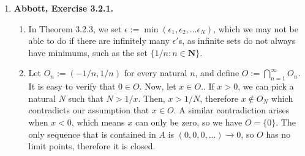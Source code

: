 \documentclass{article}
\makeatletter
\DeclarePairedDelimiter\abs{\lvert}{\rvert}
\let\oldabs\abs
\def\abs{\@ifstar{\oldabs}{\oldabs*}}
\newcommand{\N}{\mathbf{N}}
\newcommand{\R}{\mathbf{R}}
\newcommand{\set}[1]{\{#1\}}
\newcommand{\exc}[2][Abbott]{\item \textbf{#1, Exercise #2.}}
\newcommand{\lep}[1][L]{#1et $\epsilon > 0$ be arbitrary}
\let\oldmin\min
\renewcommand{\min}[1]{\oldmin \left( #1 \right)}
\makeatother
\begin{document}
\begin{enumerate}
\begin{enumerate}
        While in the previous proof we used the fact that $(s_n)$ converges to prove that
        \begin{equation*}
            \sum_{k=1}^\infty s_k(y_k-y_{k+1})
        \end{equation*} converges, we really only needed $(s_n)$ to be bounded, so the same proof applies. The other slight difference is when we applied the Algebraic Limit Theorem to show that $s_n y_{n+1}$ converges. This does not work here, since $(s_n)$ does not necessarily converge. To see that this is not a problem, \lep. Let $M \in \R$ be a bound for $(s_n)$. Use the fact that $(y_n) \to 0$ to choose $N \in \N$ such that $\abs{y_n} < \epsilon/M$ for all $n \geq M$. Then, $\abs{s_n y_{n+1}} \leq M \abs{y_{n+1}} < \epsilon$, therefore $(s_n y_{n+1}) \to 0$. For the same reason as before, this means that
        \begin{equation*}
            \sum_{k=1}^\infty x_k y_k
        \end{equation*} converges.
        
        \item Let $(x_k) = (-1)^{k+1}$ and $(y_n) \to 0$ be decreasing. Notice that the partial sums of $(x_k)$ are bounded by $1$. By Dirichlet's Test, 
        \begin{equation*}
            \sum_{k=1}^\infty (-1)^{k+1} y_n
        \end{equation*} converges.
    \end{enumerate}
    
    \exc{3.2.1}
    \begin{enumerate}
        \item In Theorem 3.2.3, we set $\epsilon := \min{\epsilon_1, \epsilon_2, \dots 
        \epsilon_N}$, which we may not be able to do if there are infinitely many $\epsilon'$s, as infinite sets do not always have minimums, such as the set $\set{1/n : n \in \N}$.
        
        \item Let $O_n := (-1/n, 1/n)$ for every natural $n$, and define $O := \bigcap_{n=1}^\infty O_n$. It is easy to verify that $0 \in O$. Now, let $x \in O$.. If $x > 0$, we can pick a natural $N$ such that $N > 1/x$. Then, $x > 1/N$, therefore $x \notin O_N$ which contradicts our assumption that $x \in O$. A similar contradiction arises when $x < 0$, which means $x$ can only be zero, so we have $O = \set{0}$. The only sequence that is contained in $A$ is $(0, 0, 0, \dots) \to 0$, so $O$ has no limit points, therefore it is closed.
    \end{enumerate}
    

\end{enumerate}
\end{document}
